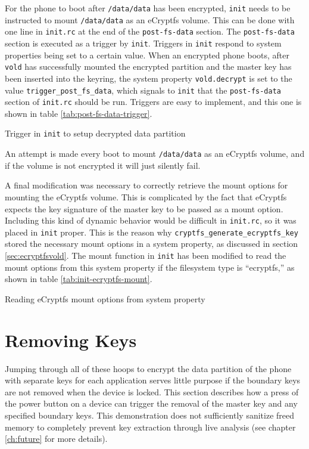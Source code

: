 For the phone to boot after \texttt{/data/data} has been encrypted, \texttt{init} needs to be instructed to mount \texttt{/data/data}
as an eCryptfs volume. This can be done with one line in \texttt{init.rc} at the end of the \texttt{post-fs-data} section. The
\texttt{post-fs-data} section is executed as a trigger by \texttt{init}. Triggers in \texttt{init} respond to system properties
being set to a certain value. When an encrypted phone boots, after \texttt{vold} has successfully mounted the encrypted partition and
the master key has been inserted into the keyring, the system property \texttt{vold.decrypt} is set to the value
\texttt{trigger\_post\_fs\_data}, which signals to \texttt{init} that the \texttt{post-fs-data} section of \texttt{init.rc} should
be run. Triggers are easy to implement, and this one is shown in table \ref{tab:post-fs-data-trigger}.  
\begin{table}
 
\caption{Trigger in \texttt{init} to setup decrypted data partition} 
\label{tab:post-fs-data-trigger}
\end{table} 
An attempt is made every boot to mount \texttt{/data/data} as an eCryptfs volume, and if the volume is not encrypted it will just
silently fail. 

A final modification was necessary to correctly retrieve the mount options for mounting the eCryptfs volume. This is complicated by
the fact that eCryptfs expects the key signature of the master key to be passed as a mount option.  Including this kind of dynamic
behavior would be difficult in \texttt{init.rc}, so it was placed in \texttt{init} proper. This is the reason why
\texttt{cryptfs\_generate\_ecryptfs\_key} stored the necessary mount options in a system property, as discussed in section
\ref{sec:ecryptfsvold}. The mount function in \texttt{init} has been modified to read the mount options from this system property if
the filesystem type is ``ecryptfs,'' as shown in table \ref{tab:init-ecryptfs-mount}.

\begin{table} 

\caption{Reading eCryptfs mount options from system property} 
\label{tab:init-ecryptfs-mount}
\end{table}

\section{Removing Keys}

Jumping through all of these hoops to encrypt the data partition of the phone with separate keys for each application serves little
purpose if the boundary keys are not removed when the device is locked. This section describes how a press of the power button on a
device can trigger the removal of the master key and any specified boundary keys. This demonstration does not sufficiently sanitize
freed memory to completely prevent key extraction through live analysis (see chapter \ref{ch:future} for more details).

